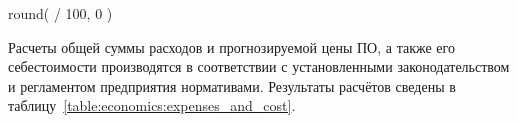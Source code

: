 
 { round( \totalExpense * \supportAndAdaptationRate / 100, 0 )}








Расчеты общей суммы расходов и прогнозируемой цены ПО, а также его себестоимости производятся в соответствии с установленными законодательством и регламентом предприятия нормативами. Результаты расчётов сведены в таблицу~\ref{table:economics:expenses_and_cost}.


